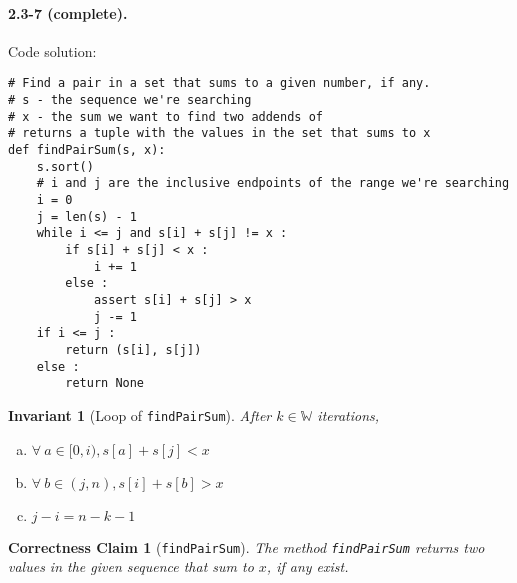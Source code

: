 \documentclass{article}
\newtheorem*{invar}{Invariant}
\newtheorem*{corclm}{Correctness Claim}
\begin{document}
\paragraph{2.3-7 (complete).}
Code solution:

\begin{verbatim}
# Find a pair in a set that sums to a given number, if any.
# s - the sequence we're searching
# x - the sum we want to find two addends of
# returns a tuple with the values in the set that sums to x
def findPairSum(s, x):
    s.sort()
    # i and j are the inclusive endpoints of the range we're searching
    i = 0
    j = len(s) - 1
    while i <= j and s[i] + s[j] != x :
        if s[i] + s[j] < x :
            i += 1
        else :
            assert s[i] + s[j] > x
            j -= 1
    if i <= j :
        return (s[i], s[j])
    else :
        return None
\end{verbatim}

\begin{invar}[Loop of \texttt{findPairSum}]
After $k \in \mathbb{W}$ iterations,

\begin{enumerate}[(a)]
  \item $\forall \  a \in [0, i), s[a] + s[j] < x$
  \item $\forall \ b \in (j, n), s[i] + s[b] > x$
  \item $j-i = n - k - 1$
\end{enumerate}

\end{invar}

\begin{corclm}[\texttt{findPairSum}]
The method \texttt{findPairSum} returns two values
in the given sequence that sum to $x$, if any exist.
\end{corclm}
\end{document}
